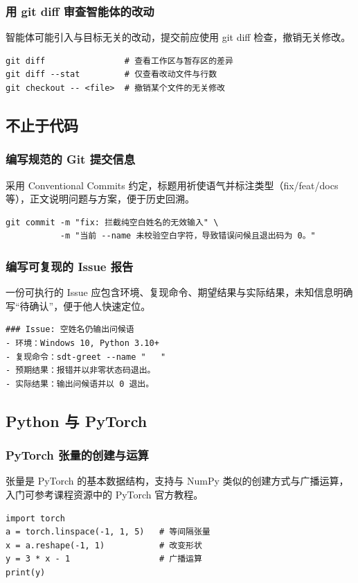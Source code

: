 \subsubsection{用 git diff 审查智能体的改动}
智能体可能引入与目标无关的改动，提交前应使用 git diff 检查，撤销无关修改。
\begin{verbatim}
git diff                # 查看工作区与暂存区的差异
git diff --stat         # 仅查看改动文件与行数
git checkout -- <file>  # 撤销某个文件的无关修改
\end{verbatim}

\subsection{不止于代码}

\subsubsection{编写规范的 Git 提交信息}
采用 Conventional Commits 约定，标题用祈使语气并标注类型（fix/feat/docs 等），正文说明问题与方案，便于历史回溯。
\begin{verbatim}
git commit -m "fix: 拦截纯空白姓名的无效输入" \
           -m "当前 --name 未校验空白字符，导致错误问候且退出码为 0。"
\end{verbatim}

\subsubsection{编写可复现的 Issue 报告}
一份可执行的 Issue 应包含环境、复现命令、期望结果与实际结果，未知信息明确写“待确认”，便于他人快速定位。
\begin{verbatim}
### Issue: 空姓名仍输出问候语
- 环境：Windows 10, Python 3.10+
- 复现命令：sdt-greet --name "   "
- 预期结果：报错并以非零状态码退出。
- 实际结果：输出问候语并以 0 退出。
\end{verbatim}

\subsection{Python 与 PyTorch}

\subsubsection{PyTorch 张量的创建与运算}
张量是 PyTorch 的基本数据结构，支持与 NumPy 类似的创建方式与广播运算，入门可参考课程资源中的 PyTorch 官方教程。
\begin{verbatim}
import torch
a = torch.linspace(-1, 1, 5)   # 等间隔张量
x = a.reshape(-1, 1)           # 改变形状
y = 3 * x - 1                  # 广播运算
print(y)
\end{verbatim}

